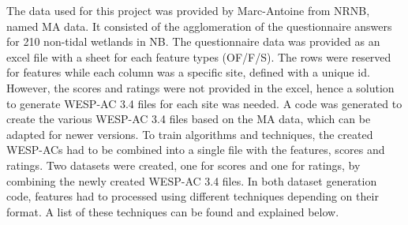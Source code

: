 \documentclass[12pt,letterpaper]{article}
\begin{document}
The data used for this project was provided by Marc-Antoine from \acf{NRNB}, named MA data.
It consisted of the agglomeration of the questionnaire answers for 210 non-tidal wetlands in NB.
The questionnaire data was provided as an excel file with a sheet for each feature types (OF/F/S).
The rows were reserved for features while each column was a specific site, defined with a unique id.
However, the scores and ratings were not provided in the excel, hence a solution to generate WESP-AC 3.4 files for each site was needed.
A code was generated to create the various WESP-AC 3.4 files based on the MA data, which can be adapted for newer versions.
To train algorithms and techniques, the created WESP-ACs had to be combined into a single file with the features, scores and ratings.
Two datasets were created, one for scores and one for ratings, by combining the newly created WESP-AC 3.4 files.
In both dataset generation code, features had to processed using different techniques depending on their format.
A list of these techniques can be found and explained below.
\end{document}
